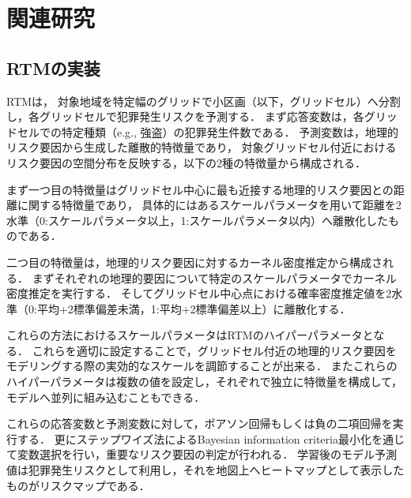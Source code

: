\section{関連研究}
\label{chapter_2}
\subsection{RTMの実装}
\label{conv_imp:sec}
RTM\cite{caplan2015risk}は，
対象地域を特定幅のグリッドで小区画（以下，グリッドセル）へ分割し，各グリッドセルで犯罪発生リスクを予測する．
まず応答変数は，各グリッドセルでの特定種類（e.g., 強盗）の犯罪発生件数である．
予測変数は，地理的リスク要因から生成した離散的特徴量であり，
対象グリッドセル付近におけるリスク要因の空間分布を反映する，以下の2種の特徴量から構成される．

まず一つ目の特徴量はグリッドセル中心に最も近接する地理的リスク要因との距離に関する特徴量であり，
具体的にはあるスケールパラメータを用いて距離を2水準（0:スケールパラメータ以上，1:スケールパラメータ以内）へ離散化したものである．

二つ目の特徴量は，地理的リスク要因に対するカーネル密度推定から構成される．
まずそれぞれの地理的要因について特定のスケールパラメータでカーネル密度推定を実行する\cite{bishop}．
そしてグリッドセル中心点における確率密度推定値を2水準（0:平均+2標準偏差未満，1:平均+2標準偏差以上）に離散化する．

これらの方法におけるスケールパラメータはRTMのハイパーパラメータとなる．
これらを適切に設定することで，グリッドセル付近の地理的リスク要因をモデリングする際の実効的なスケールを調節することが出来る．
またこれらのハイパーパラメータは複数の値を設定し，それぞれで独立に特徴量を構成して，モデルへ並列に組み込むこともできる．

これらの応答変数と予測変数に対して，ポアソン回帰\cite{poisson}もしくは負の二項回帰\cite{Hilbe_2011}を実行する．
更にステップワイズ法\cite{islp}によるBayesian information criteria最小化を通じて変数選択を行い，重要なリスク要因の判定が行われる．
学習後のモデル予測値は犯罪発生リスクとして利用し，それを地図上へヒートマップとして表示したものがリスクマップである．

 
 
